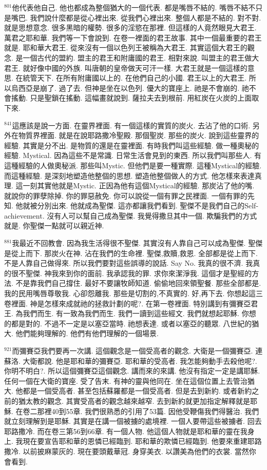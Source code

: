 \documentclass{book}
\begin{document}
$^{801}$他代表他自己.
他也都成為整個猶大的一個代表.
都是嘴唇不結的.
嘴唇不結不只是嘴巴.
我們說什麼都是從心裡出來.
從我們心裡出來.
整個人都是不結的.
對不對.
就是思想意念.
很多黑暗的權勢.
很多的淫慾在那裡.
但這樣的人竟然眼見大君王.
萬君之耶和華.
我們等一下會說到.
在卷一裡面的君王故事.
其中一個最重要的君王就是.
耶和華大君王.
從來沒有一個以色列王被稱為大君王.
其實這個大君王的觀念.
是一個古代的盟約.
盟主的君王和附庸國的君王.
相對來說.
叫盟主的君王做大君王.
就好像中國的外族.
叫唐朝的皇帝做天可汗一樣.
大君王就是一個這樣的意思.
在統管天下.
在所有附庸國以上的.
在他們自己的小國.
君王以上的大君王.
所以烏西亞是崩了.
過了去.
但神是坐在以色列.
優大的寶座上.
祂是不會崩的.
祂不會搖動.
只是聖鎖在搖動.
這幅畫就說到.
薩拉夫去到根前.
用紅炭在火炭的上面取下來.

$^{841}$這應該是說一方面.
在靈界裡面.
有一個這樣的實質的炭火.
去沾了他的口術.
另外在物質界裡面.
就是在說耶路撒冷聖殿.
那個聖炭.
那些的炭火.
說到這些靈界的經驗.
其實是分不出.
是物質的還是在靈裡面.
有時我們叫這些經驗.
做一種奧秘的經驗.
Mystical.
因為這些不是常識.
日常生活會見到的東西.
所以我們叫那些人.
有這種經驗的人做奧秘派.
那些叫Mystic.
但他們是要一種實際.
這種Mystical的經驗.
而這種經驗.
是深刻地塑造他整個的思想.
塑造他整個做人的方式.
他怎樣來表達真理.
這一刻其實他就是Mystic.
正因為他有這個Mystical的經驗.
那炭沾了他的嘴.
就說你的罪孽除掉.
你的罪惡赦免.
你可以說從一個有罪之民裡面.
一個有罪的先知.
他就被分別出來.
他就成為聖傑.
這亦都讓我們看到.
聖傑不是我們自己的Self-achievement.
沒有人可以幫自己成為聖傑.
我覺得撒旦其中一個.
欺騙我們的方式就是.
你聖傑一點就可以親近神.

$^{881}$我最近不回教會.
因為我生活得很不聖傑.
其實沒有人靠自己可以成為聖傑.
聖傑是從上而下.
那炭火在神.
沾在我們的生命裡.
聖傑,救贖,救恩.
全部都是從上而下.
不是人靠自己做得來.
所以我們要對這些誤導的說話.
Say No.
我真的很不濟.
我真的很不聖傑.
神我來到你的面前.
我承認我的罪.
求你來潔淨我.
這個才是聖經的方法.
不是靠我們自己撐住.
最好不要讓牧師知道.
偷偷地回來領聖餐.
那些全部都是.
我的民用嘴唇尊敬我.
心卻怨離我.
那些是切割的,不真實的.
好,再下去.
你想起這三卷裡面.
神是怎樣來成就祂的拯救計劃的呢?.
在第一卷裡面.
特別講到有彌賽亞君王.
為我們而生.
有一致為我們而生.
我們一讀到這些經文.
我們就想起耶穌.
你想的都是對的.
不過不一定是以塞亞當時.
祂想表達.
或者以塞亞的聽眾.
八世紀的猶大.
他們能夠理解的.
他們有他們理解的一個場景.

$^{921}$而彌賽亞我們要再一次講.
這個觀念是一個受高者的觀念.
大衛是一個彌賽亞.
連蘇洛.
大衛都說.
他是耶和華的彌賽亞.
耶和華的受高者.
我怎能夠動手去殺他呢?.
你明不明白?.
所以這個彌賽亞這個觀念.
講而來的來講.
他沒有指定一定是講耶穌.
任何一個在大衛的寶座.
受了告末.
有神的靈與他同在.
坐在這個位置上去管治猶大.
他都是一個受高者.
甚至包括蘇羅都是一個受高者.
但是去到新約.
或者新約之前的猶太教的觀念.
其實受高者的觀念越來越窄.
去到新約就更加指定解釋就是耶穌.
在卷二那裡40到55章.
我們很熟悉的引用了53篇.
因他受鞭傷我們得醫治.
我們就立刻理解到是耶穌.
其實是在講一個被擄的處境裡.
一個人要帶這些被擄者.
回去耶路撒冷.
而在卷三第56到66章.
有一個人物.
他這個人物就是耶和華的靈在我身上.
我現在要宣告耶和華的恩憐已經臨到.
耶和華的欺憐已經臨到.
他要來重建耶路撒冷.
以前披麻蒙灰的.
現在要頭戴華冠.
身穿美衣.
以讚美為他們的衣裳.
當然你會看到.
\end{document}
